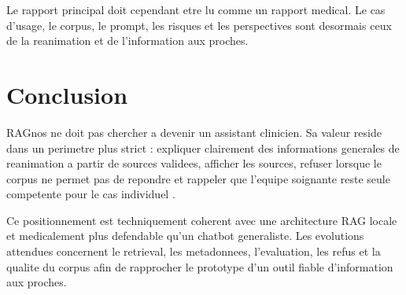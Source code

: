 \documentclass[11pt,a4paper]{article}
\begin{document}
Le rapport principal doit cependant etre lu comme un rapport medical. Le cas d'usage, le corpus, le prompt, les risques et les perspectives sont desormais ceux de la reanimation et de l'information aux proches.

\section{Conclusion}

RAGnos ne doit pas chercher a devenir un assistant clinicien. Sa valeur reside dans un perimetre plus strict : expliquer clairement des informations generales de reanimation a partir de sources validees, afficher les sources, refuser lorsque le corpus ne permet pas de repondre et rappeler que l'equipe soignante reste seule competente pour le cas individuel \autocite{sccmFamilyCentered2024,sfarInfoPatientsRea,euAIActHealthcare}.

Ce positionnement est techniquement coherent avec une architecture RAG locale et medicalement plus defendable qu'un chatbot generaliste. Les evolutions attendues concernent le retrieval, les metadonnees, l'evaluation, les refus et la qualite du corpus afin de rapprocher le prototype d'un outil fiable d'information aux proches.

\printbibliography
\end{document}
